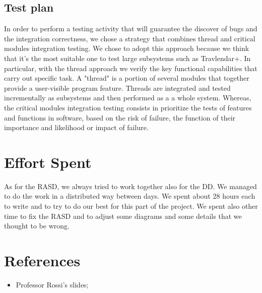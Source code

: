 \documentclass[12pt,titlepage]{article}
\begin{document}
\subsection{Test plan}
In order to perform a testing activity that will guarantee the discover of bugs and the integration correctness, we chose a strategy that combines thread and critical modules integration testing. We chose to adopt this approach because we think that it's the most suitable one to test large subsystems such as Travlendar+.
In particular, with the thread approach we verify the key functional capabilities that carry out specific task. A "thread" is a portion of several modules that together provide a user-visible program feature. Threads are integrated and tested incrementally as subsystems and then performed as a a whole system.
Whereas, the critical modules integration testing consists in prioritize the tests of features and functions in software, based on the risk of failure, the function of their importance and likelihood or impact of failure. 

\pagebreak

\section{Effort Spent}
As for the RASD, we always tried to work together also for the DD. We managed to do the work in a distributed way between days. We spent about 28 hours each to write and to try to do our best for this part of the project.
We spent also other time to fix the RASD and to adjust some diagrams and some details that we thought to be wrong.

\section{References}
\begin{itemize}
\item Professor Rossi's slides;
\end{itemize}
\end{document}
